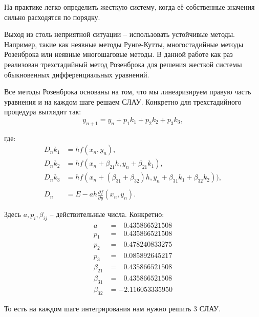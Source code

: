 		На практике легко определить жесткую систему, когда её собственные значения сильно расходятся по порядку.
		
		Выход из столь неприятной ситуации -- использовать устойчивые методы. Например, такие как неявные методы Рунге-Кутты, многостадийные методы Розенброка или неявные многошаговые методы. В данной работе как раз реализован трехстадийный метод Розенброка для решения жесткой системы обыкновенных дифференциальных уравнений.
		
		
		\newpage
		Все методы Розенброка основаны на том, что мы линеаризируем правую часть уравнения и на каждом шаге решаем СЛАУ. Конкретно для трехстадийного процедура выглядит так:
		\begin{equation*}
			y_{n+1} = y_n + p_1 k_1 + p_2 k_2 + p_3 k_3,
		\end{equation*}
	
		\noindent где:
		\begin{equation*}
			\begin{split}
				D_n k_1 &= hf(x_n, y_n), \\
				D_n k_2 &= hf(x_n + \beta_{21}h, y_n + \beta_{21} k_1), \\
				D_n k_3 &= hf(x_n + (\beta_{31} + \beta_{32})h, y_n + \beta_{31} k_1 + \beta_{32} k_2)),\\
				\\
				D_n \;\; &= E - ah\frac{\partial f}{\partial y}(x_n, y_n).
			\end{split}
		\end{equation*}
		
		Здесь $a, p_i, \beta_{ij}$ -- действительные числа. Конкретно:
		\begin{equation*}
			\begin{split}
				a   &= \;\;\, 0.435866521508 \\
				p_1 &= \;\;\, 0.435866521508 \\
				p_2 &= \;\;\, 0.478240833275 \\
				p_3 &= \;\;\, 0.085892645217 \\
				\beta_{21} &= \;\;\, 0.435866521508 \\
				\beta_{31} &= \;\;\, 0.435866521508 \\
				\beta_{32} &= -2.116053335950
			\end{split}
		\end{equation*}
	
		То есть на каждом шаге интегрирования нам нужно решить 3 СЛАУ.
		
